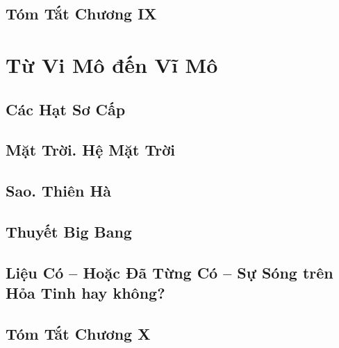 \documentclass{article}
\numberwithin{equation}{section}
\begin{document}

\subsection{Tóm Tắt Chương IX}


\section{Từ Vi Mô đến Vĩ Mô}

\subsection{Các Hạt Sơ Cấp}


\subsection{Mặt Trời. Hệ Mặt Trời}


\subsection{Sao. Thiên Hà}


\subsection{Thuyết Big Bang}


\subsection{Liệu Có -- Hoặc Đã Từng Có -- Sự Sóng trên Hỏa Tinh hay không?}

\subsection{Tóm Tắt Chương X}


\newpage
\printbibliography[heading=bibintoc]
	
\end{document}
